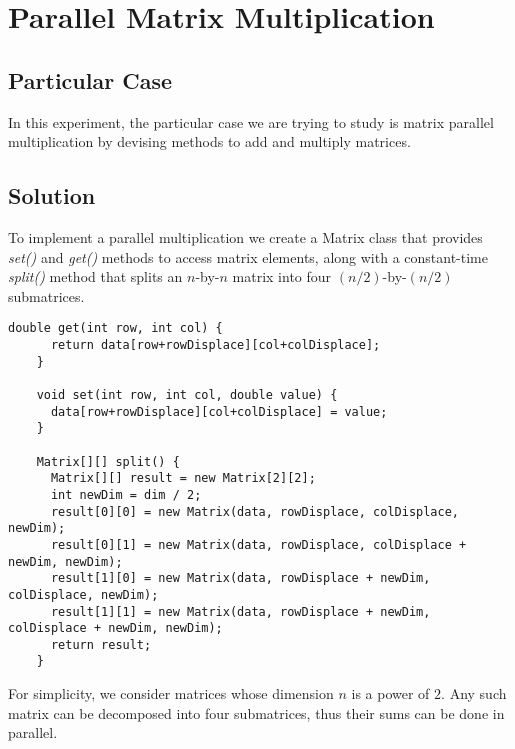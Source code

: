 


\section{\textbf{Parallel Matrix Multiplication}}



\subsection{Particular Case}
\par
In this experiment, the particular case we are trying to study is matrix parallel multiplication by devising methods to add and multiply matrices.
\par



\subsection{Solution}
\par
To implement a parallel multiplication we create a Matrix class that provides \textit{set()} and \textit{get()} methods to access matrix elements, along with a constant-time \textit{split()} method that splits an $n$-by-$n$ matrix into four $(n/2)$-by-$(n/2)$ submatrices.
\par
\begin{lstlisting}[frame=single,breaklines=true]
    double get(int row, int col) {
      return data[row+rowDisplace][col+colDisplace];
    }
    
    void set(int row, int col, double value) {
      data[row+rowDisplace][col+colDisplace] = value;
    }    
    
    Matrix[][] split() {
      Matrix[][] result = new Matrix[2][2];
      int newDim = dim / 2;
      result[0][0] = new Matrix(data, rowDisplace, colDisplace, newDim);
      result[0][1] = new Matrix(data, rowDisplace, colDisplace + newDim, newDim);
      result[1][0] = new Matrix(data, rowDisplace + newDim, colDisplace, newDim);
      result[1][1] = new Matrix(data, rowDisplace + newDim, colDisplace + newDim, newDim);
      return result;
    }
\end{lstlisting}
For simplicity, we consider matrices whose dimension $n$ is a power of $2$. Any such matrix can be decomposed into four submatrices, thus their sums can be done in parallel.
\par


